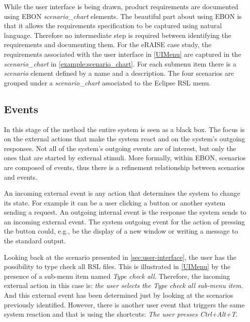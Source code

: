 \documentclass[conference]{IEEEtran}
\newcommand{\eg}{e.g.,\xspace}
\begin{document}
While the user interface is being drawn, product requirements are
documented using EBON \emph{scenario\_chart} elements. The beautiful
part about using EBON is that it allows the requirements specification
to be captured using natural language. Therefore no intermediate step
is required between identifying the requirements and documenting them.
For the eRAISE case study, the requirements associated with the user
interface in \autoref{UIMenu} are captured in the
\emph{scenario\_chart} in \autoref{example:scenario_chart}. For each
submenu item there is a \emph{scenario} element defined by a name and a
description. The four scenarios are grouped under a
\emph{scenario\_chart} associated to the Eclipse RSL menu.

%
\subsection{Events}
\label{sec:events}

In this stage of the method the entire system is seen as a black
box. The focus is on the external actions that make the system react
and on the system's outgoing responses.  Not all of the system's
outgoing events are of interest, but only the ones that are started by
external stimuli.  More formally, within EBON, scenarios are composed
of events, thus there is a refinement relationship between scenarios
and events.

An incoming external event is any action that determines the system to
change its state. For example it can be a user clicking a button or
another system sending a request.  An outgoing internal event is the
response the system sends to an incoming external event. The system
outgoing event for the action of pressing the button could, \eg be the
display of a new window or writing a message to the standard output.

Looking back at the scenario presented in
\autoref{sec:user-interface}, the user has the possibility to type
check all RSL files. This is illustrated in \autoref{UIMenu} by the
presence of a sub-menu item named \emph{Type check all}. Therefore,
the incoming external action in this case is: \emph{the user selects
the Type check all sub-menu item}. And this external event has been
determined just by looking at the scenarios previously identified.
However, there is another user event that triggers the same system
reaction and that is using the shortcuts: \emph{The user presses
Ctrl+Alt+T}.


\end{document}
